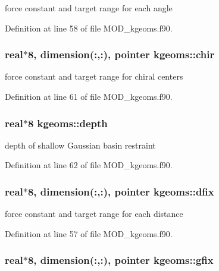 force constant and target range for each angle 



Definition at line 58 of file M\-O\-D\-\_\-kgeoms.\-f90.

\hypertarget{classkgeoms_abd91d0c33a114e39b4c6af7687637f5f}{
\subsubsection[{chir}]{\setlength{\rightskip}{0pt plus 5cm}real$\ast$8, dimension(\-:,\-:), pointer kgeoms\-::chir}}\label{classkgeoms_abd91d0c33a114e39b4c6af7687637f5f}


force constant and target range for chiral centers 



Definition at line 61 of file M\-O\-D\-\_\-kgeoms.\-f90.

\hypertarget{classkgeoms_a326e1f409617ba95423a00b96cc7f133}{
\subsubsection[{depth}]{\setlength{\rightskip}{0pt plus 5cm}real$\ast$8 kgeoms\-::depth}}\label{classkgeoms_a326e1f409617ba95423a00b96cc7f133}


depth of shallow Gaussian basin restraint 



Definition at line 62 of file M\-O\-D\-\_\-kgeoms.\-f90.

\hypertarget{classkgeoms_a3fd45aae33139298589f66472ad1b9ca}{
\subsubsection[{dfix}]{\setlength{\rightskip}{0pt plus 5cm}real$\ast$8, dimension(\-:,\-:), pointer kgeoms\-::dfix}}\label{classkgeoms_a3fd45aae33139298589f66472ad1b9ca}


force constant and target range for each distance 



Definition at line 57 of file M\-O\-D\-\_\-kgeoms.\-f90.

\hypertarget{classkgeoms_a61e4432d014ac7a31221f573b201c84d}{
\subsubsection[{gfix}]{\setlength{\rightskip}{0pt plus 5cm}real$\ast$8, dimension(\-:,\-:), pointer kgeoms\-::gfix}}\label{classkgeoms_a61e4432d014ac7a31221f573b201c84d}



